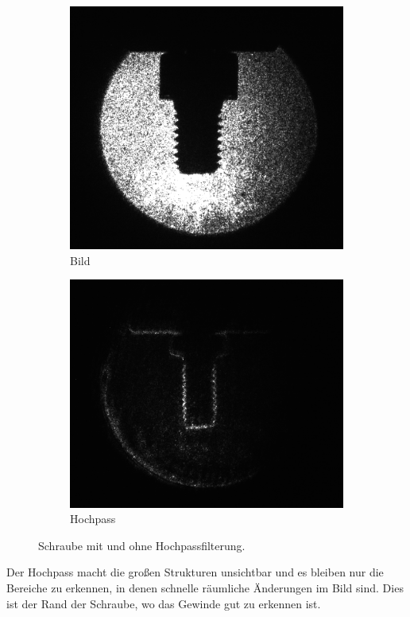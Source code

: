 \documentclass[
	a4paper,
	12pt,
	pagesize,
	ngerman
]{scrartcl}
\begin{document}
\begin{itemize}
\begin{figure}[H]
\begin{subfigure}[b]{0.475\textwidth}
            \centering
            \includegraphics[width=\textwidth]{raw/4/4_schraub}
            \caption%
            {Bild}
            \label{fig_4_schraub_bild}
        \end{subfigure}
        \hfill
        \begin{subfigure}[b]{0.475\textwidth}
            \centering
            \includegraphics[width=\textwidth]{raw/4/4_schraub_hochpass}
            \caption[]%
            {Hochpass}
            \label{fig_4_schraub_hochpass}
        \end{subfigure}
        \caption%
        {
				Schraube mit und ohne Hochpassfilterung.
				}
        \label{fig_4_schraub}
    \end{figure}
	Der Hochpass macht die großen Strukturen unsichtbar und es bleiben nur die Bereiche zu erkennen, in denen schnelle räumliche Änderungen im Bild sind.
	Dies ist der Rand der Schraube, wo das Gewinde gut zu erkennen ist.


\end{itemize}
\end{document}
